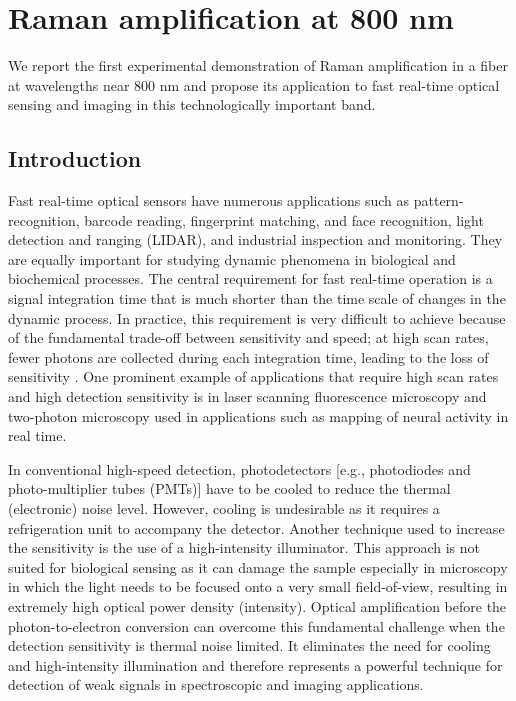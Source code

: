 \chapter{Raman amplification at 800 nm}
\label{chp:CLEO2010_Chapter}

We report the first experimental demonstration of Raman amplification in a fiber at wavelengths near 800 nm and propose its application to fast real-time optical sensing and imaging in this technologically important band. 

\section{Introduction}

Fast real-time optical sensors have numerous applications such as pattern-recognition, barcode reading, fingerprint matching, and face recognition, light detection and ranging (LIDAR), and industrial inspection and monitoring. They are equally important for studying dynamic phenomena in biological and biochemical processes. The central requirement for fast real-time operation is a signal integration time that is much shorter than the time scale of changes in the dynamic process. In practice, this requirement is very difficult to achieve because of the fundamental trade-off between sensitivity and speed; at high scan rates, fewer photons are collected during each integration time, leading to the loss of sensitivity \cite{goda2009serial,goda2008amplified,goda2009theory}. One prominent example of applications that require high scan rates and high detection sensitivity is in laser scanning fluorescence microscopy and two-photon microscopy used in applications such as mapping of neural activity in real time.

In conventional high-speed detection, photodetectors [e.g., photodiodes and photo-multiplier tubes (PMTs)] have to be cooled to reduce the thermal (electronic) noise level. However, cooling is undesirable as it requires a refrigeration unit to accompany the detector. Another technique used to increase the sensitivity is the use of a high-intensity illuminator. This approach is not suited for biological sensing as it can damage the sample especially in microscopy in which the light needs to be focused onto a very small field-of-view, resulting in extremely high optical power density (intensity). Optical amplification before the photon-to-electron conversion can overcome this fundamental challenge when the detection sensitivity is thermal noise limited. It eliminates the need for cooling and high-intensity illumination and therefore represents a powerful technique for detection of weak signals in spectroscopic and imaging applications. 

